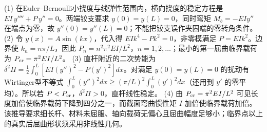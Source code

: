 (1) 在Euler–Bernoulli小挠度与线弹性范围内，横向挠度的稳定方程是 \(EI\,y''''+P\,y''=0\)。两端铰支要求 \(y(0)=y(L)=0\)，同时弯矩 \(M_b=-EI y''\) 在端点为零，故 \(y''(0)=y''(L)=0\)；不能把铰支误作夹固端的零转角条件。
(2) 令 \(y(x)=A\sin(kx)\)，代入得 \(EI k^4-Pk^2=0\)，非零模满足 \(P=EI k^2\)。边界使 \(k_n=n\pi/L\)，因此 \(P_n=n^2\pi^2EI/L^2\)，\(n=1,2,\ldots\)；最小的第一屈曲临界载荷为 \(P_{\rm cr}=\pi^2EI/L^2\)。
(3) 直杆附近的二次势能为 \(\delta^2\Pi=\frac12\int_0^L[EI(y'')^2-P(y')^2]dx\)。对满足 \(y(0)=y(L)=0\) 的扰动有Wirtinger型不等式 \(\int_0^L(y'')^2dx\ge(\pi/L)^2\int_0^L(y')^2dx\)（还用到 \(y'\) 的零平均）。所以若 \(P<P_{\rm cr}\)，\(\delta^2\Pi>0\)，直杆线性稳定。
(4) 由 \(P_{\rm cr}=\pi^2EI/L^2\) 可见长度加倍使临界载荷下降到四分之一，而截面弯曲惯性矩 \(I\) 加倍使临界载荷加倍。该推导要求细长杆、材料未屈服、轴向载荷无偏心且屈曲幅度足够小；临界点以上的真实后屈曲形状须采用非线性几何。
